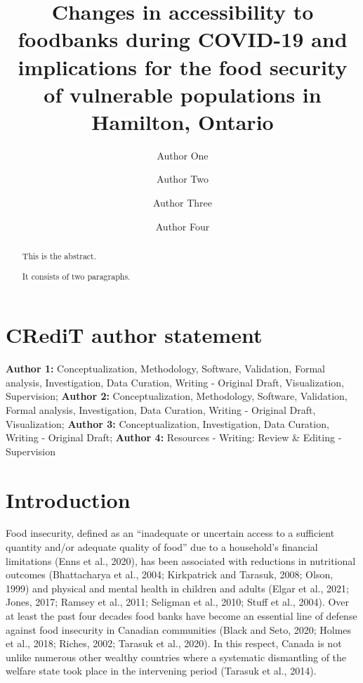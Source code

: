 \documentclass[]{elsarticle} %
\begin{document}
\begin{frontmatter}

  \title{Changes in accessibility to foodbanks during COVID-19 and
implications for the food security of vulnerable populations in
Hamilton, Ontario}
    \author[Some University]{Author One}
    \author[]{Author Two}
    \author[Some University]{Author Three}
    \author[Another University]{Author Four}
      \address[Some University]{Department, Street, City, State, Zip}
    \address[Another University]{Department, Street, City, State, Zip}
  
  \begin{abstract}
  This is the abstract.

  It consists of two paragraphs.
  \end{abstract}
  
 \end{frontmatter}

\hypertarget{credit-author-statement}{%
\section{CRediT author statement}\label{credit-author-statement}}

\textbf{Author 1:} Conceptualization, Methodology, Software, Validation,
Formal analysis, Investigation, Data Curation, Writing - Original Draft,
Visualization, Supervision; \textbf{Author 2:} Conceptualization,
Methodology, Software, Validation, Formal analysis, Investigation, Data
Curation, Writing - Original Draft, Visualization; \textbf{Author 3:}
Conceptualization, Investigation, Data Curation, Writing - Original
Draft; \textbf{Author 4:} Resources - Writing: Review \& Editing -
Supervision

\newpage

\hypertarget{introduction}{%
\section{Introduction}\label{introduction}}

Food insecurity, defined as an ``inadequate or uncertain access to a
sufficient quantity and/or adequate quality of food'' due to a
household's financial limitations (Enns et al., 2020), has been
associated with reductions in nutritional outcomes (Bhattacharya et al.,
2004; Kirkpatrick and Tarasuk, 2008; Olson, 1999) and physical and
mental health in children and adults (Elgar et al., 2021; Jones, 2017;
Ramsey et al., 2011; Seligman et al., 2010; Stuff et al., 2004). Over at
least the past four decades food banks have become an essential line of
defense against food insecurity in Canadian communities (Black and Seto,
2020; Holmes et al., 2018; Riches, 2002; Tarasuk et al., 2020). In this
respect, Canada is not unlike numerous other wealthy countries where a
systematic dismantling of the welfare state took place in the
intervening period (Tarasuk et al., 2014).
\end{document}
